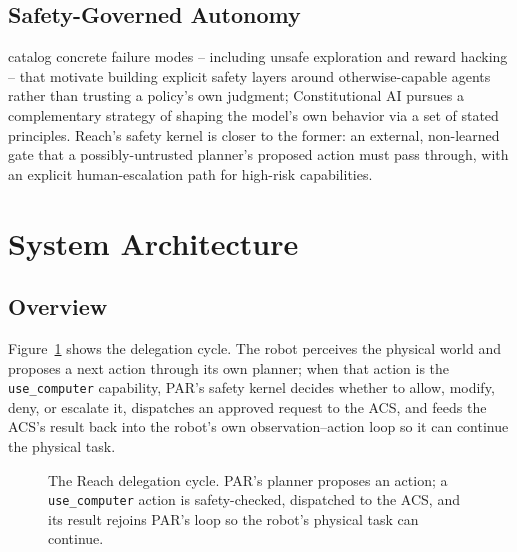 \documentclass{article}
\begin{document}
\subsection{Safety-Governed Autonomy}
\citet{amodei2016concrete} catalog concrete failure
modes -- including unsafe exploration and reward hacking -- that motivate
building explicit safety layers around otherwise-capable agents rather
than trusting a policy's own judgment; Constitutional
AI \citep{bai2022constitutional} pursues a complementary strategy of
shaping the model's own behavior via a set of stated principles. Reach's
safety kernel is closer to the former: an external, non-learned gate that
a possibly-untrusted planner's proposed action must pass through, with an
explicit human-escalation path for high-risk capabilities.

\section{System Architecture}

\subsection{Overview}
Figure~\ref{fig:cycle} shows the delegation cycle. The robot perceives the
physical world and proposes a next action through its own planner; when
that action is the \texttt{use\_computer} capability, PAR's safety kernel
decides whether to allow, modify, deny, or escalate it, dispatches an
approved request to the ACS, and feeds the ACS's result back into the
robot's own observation--action loop so it can continue the physical task.

\begin{figure}[t]
\centering
{}
\caption{The Reach delegation cycle. PAR's planner proposes an action; a
\texttt{use\_computer} action is safety-checked, dispatched to the ACS, and
its result rejoins PAR's loop so the robot's physical task can continue.}
\label{fig:cycle}
\end{figure}
\end{document}
